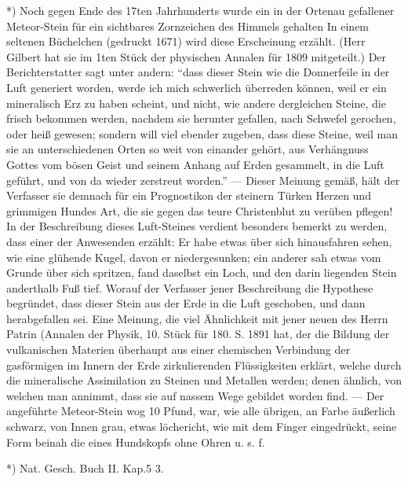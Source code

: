 \documentclass[a4paper, 11pt, oneside, polutonikogreek, german]{article}
\begin{document}
*) Noch gegen Ende des 17ten Jahrhunderts wurde ein in der Ortenau gefallener Meteor-Stein für ein sichtbares Zornzeichen des Himmels gehalten In einem seltenen Büchelchen (gedruckt 1671) wird diese Erscheinung erzählt. (Herr Gilbert hat sie im 1ten Stück der physischen Annalen für 1809 mitgeteilt.) Der Berichterstatter sagt unter andern: "`dass dieser Stein wie die Donnerfeile in der Luft generiert worden, werde ich mich schwerlich überreden können, weil er ein mineralisch Erz zu haben scheint, und nicht, wie andere dergleichen Steine, die frisch bekommen werden, nachdem sie herunter gefallen, nach Schwefel gerochen, oder heiß gewesen; sondern will viel ebender zugeben, dass diese Steine, weil man sie an unterschiedenen Orten so weit von einander gehört, aus Verhängnuss Gottes vom bösen Geist und seinem Anhang auf Erden gesammelt, in die Luft geführt, und von da wieder zerstreut worden."' --- Dieser Meinung gemäß, hält der Verfasser sie demnach für ein Prognostikon der steinern Türken Herzen und grimmigen Hundes Art, die sie gegen das teure Christenblut zu verüben pflegen! In der Beschreibung dieses Luft-Steines verdient besonders bemerkt zu werden, dass einer der Anwesenden erzählt: Er habe etwas über sich hinausfahren sehen, wie eine glühende Kugel, davon er niedergesunken; ein anderer sah etwas vom Grunde über sich spritzen, fand daselbst ein Loch, und den darin liegenden Stein anderthalb Fuß tief. Worauf der Verfasser jener Beschreibung die Hypothese begründet, dass dieser Stein aus der Erde in die Luft geschoben, und dann herabgefallen sei. Eine Meinung, die viel Ähnlichkeit mit jener neuen des Herrn Patrin (Annalen der Physik, 10. Stück für 180. S. 1891 hat, der die Bildung der vulkanischen Materien überhaupt aus einer chemischen Verbindung der gasförmigen im Innern der Erde zirkulierenden Flüssigkeiten erklärt, welche durch die mineralische Assimilation zu Steinen und Metallen werden; denen ähnlich, von welchen man annimmt, dass sie auf nassem Wege gebildet worden find. --- Der angeführte Meteor-Stein wog 10 Pfund, war, wie alle übrigen, an Farbe äußerlich schwarz, von Innen grau, etwas löchericht, wie mit dem Finger eingedrückt, seine Form beinah die eines Hundskopfs ohne Ohren u. s. f.

*) Nat. Gesch. Buch II. Kap.5 3.
\end{document}
